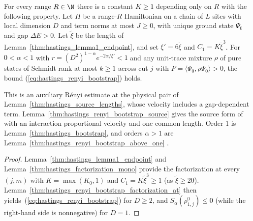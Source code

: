 \begin{lemma}
    \label{thm:hastings_renyi_bootstrap}
    \leanok
    For every range $R\in\N$ there is a constant $K\ge1$ depending only on $R$
    with the following property. Let $H$ be a range-$R$ Hamiltonian on a chain
    of $L$ sites with local dimension $D$ and term norms at most $J\ge0$, with
    unique ground state $\Psi_0$ and gap $\Delta E>0$. Let $\tilde\xi$ be the
    length of Lemma~\ref{thm:hastings_lemma1_endpoint}, and set
    $\xi'=6\tilde\xi$ and $C_1=K\tilde\xi^3$. For $0<\alpha<1$ with
    $r=(D^2)^{1-\alpha}e^{-2\alpha/\xi'}<1$ and any unit-trace mixture $\rho$
    of pure states of Schmidt rank at most $k\ge1$ across cut $j$ with
    $P=\langle\Psi_0,\rho\Psi_0\rangle>0$, the bound
    (\ref{eq:hastings_renyi_bootstrap}) holds.

    This is an auxiliary Rényi estimate at the physical pair of
    Lemma~\ref{thm:hastings_source_lengths}, whose velocity includes a
    gap-dependent term. Lemma~\ref{thm:hastings_renyi_bootstrap_source}
    gives the source form of \cite[Lemma~2, lines 392--410]{Hastings2007AreaLaw}
    with an interaction-proportional velocity and one common length.
    Order $1$ is Lemma~\ref{thm:hastings_bootstrap}, and orders $\alpha>1$
    are Lemma~\ref{thm:hastings_renyi_bootstrap_above_one}
    \cite{gap:hastings07_renyi_bootstrap_orders}.
\end{lemma}
\begin{proof}\leanok
    Lemma~\ref{thm:hastings_lemma1_endpoint} and
    Lemma~\ref{thm:hastings_factorization_mono} provide the factorization at
    every $(j,m)$ with $K=\max(K_0,1)$ and $C_1=K\tilde\xi^3\ge1$ (as
    $\tilde\xi\ge20$). Lemma~\ref{thm:hastings_renyi_bootstrap_factorization_at}
    then yields~(\ref{eq:hastings_renyi_bootstrap}) for $D\ge2$, and
    $S_\alpha(\rho^0_{1,j})\le0$ (while the right-hand side is nonnegative) for
    $D=1$.
\end{proof}


